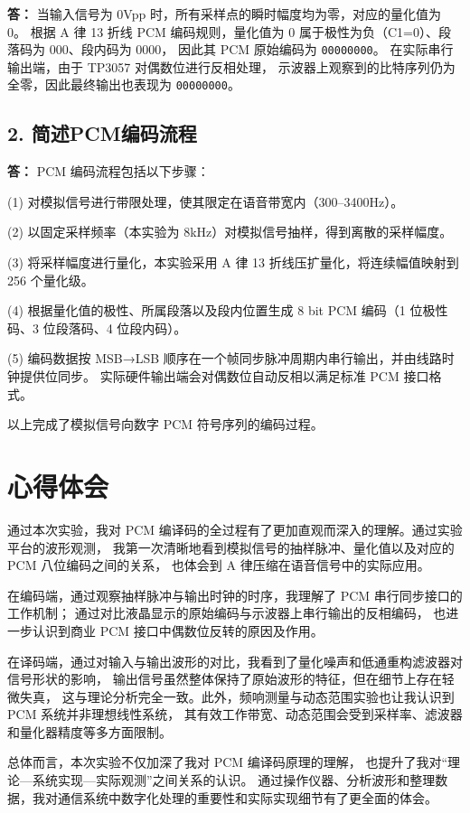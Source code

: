 \documentclass{xjtureport}
\begin{document}
\textbf{答：}
当输入信号为 0Vpp 时，所有采样点的瞬时幅度均为零，对应的量化值为 0。
根据 A 律 13 折线 PCM 编码规则，量化值为 0 属于极性为负（C1=0）、段落码为 000、段内码为 0000，
因此其 PCM 原始编码为 \texttt{00000000}。
在实际串行输出端，由于 TP3057 对偶数位进行反相处理，
示波器上观察到的比特序列仍为全零，因此最终输出也表现为 \texttt{00000000}。


\subsection*{2. 简述PCM编码流程}

\textbf{答：}
PCM 编码流程包括以下步骤：

(1) 对模拟信号进行带限处理，使其限定在语音带宽内（300--3400Hz）。

(2) 以固定采样频率（本实验为 8kHz）对模拟信号抽样，得到离散的采样幅度。

(3) 将采样幅度进行量化，本实验采用 A 律 13 折线压扩量化，将连续幅值映射到 256 个量化级。

(4) 根据量化值的极性、所属段落以及段内位置生成 8 bit PCM 编码（1 位极性码、3 位段落码、4 位段内码）。

(5) 编码数据按 MSB→LSB 顺序在一个帧同步脉冲周期内串行输出，并由线路时钟提供位同步。
实际硬件输出端会对偶数位自动反相以满足标准 PCM 接口格式。

以上完成了模拟信号向数字 PCM 符号序列的编码过程。


\section{心得体会}

通过本次实验，我对 PCM 编译码的全过程有了更加直观而深入的理解。通过实验平台的波形观测，
我第一次清晰地看到模拟信号的抽样脉冲、量化值以及对应的 PCM 八位编码之间的关系，
也体会到 A 律压缩在语音信号中的实际应用。

在编码端，通过观察抽样脉冲与输出时钟的时序，我理解了 PCM 串行同步接口的工作机制；
通过对比液晶显示的原始编码与示波器上串行输出的反相编码，
也进一步认识到商业 PCM 接口中偶数位反转的原因及作用。

在译码端，通过对输入与输出波形的对比，我看到了量化噪声和低通重构滤波器对信号形状的影响，
输出信号虽然整体保持了原始波形的特征，但在细节上存在轻微失真，
这与理论分析完全一致。此外，频响测量与动态范围实验也让我认识到 PCM 系统并非理想线性系统，
其有效工作带宽、动态范围会受到采样率、滤波器和量化器精度等多方面限制。

总体而言，本次实验不仅加深了我对 PCM 编译码原理的理解，
也提升了我对“理论—系统实现—实际观测”之间关系的认识。
通过操作仪器、分析波形和整理数据，我对通信系统中数字化处理的重要性和实际实现细节有了更全面的体会。
\end{document}
